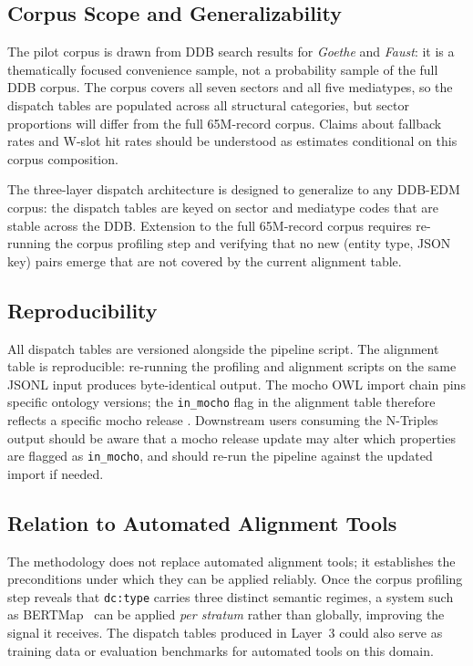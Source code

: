 \subsection{Corpus Scope and Generalizability}

The pilot corpus is drawn from DDB search results for \textit{Goethe} and
\textit{Faust}: it is a thematically focused convenience sample, not a
probability sample of the full DDB corpus.
The corpus covers all seven sectors and all five mediatypes, so the dispatch
tables are populated across all structural categories, but sector proportions
will differ from the full 65M-record corpus.
Claims about fallback rates and W-slot hit rates should be understood as
estimates conditional on this corpus composition.

The three-layer dispatch architecture is designed to generalize to any
DDB-EDM corpus: the dispatch tables are keyed on sector and mediatype codes
that are stable across the DDB.
Extension to the full 65M-record corpus requires re-running the corpus
profiling step and verifying that no new (entity type, JSON key) pairs
emerge that are not covered by the current alignment table.

\subsection{Reproducibility}

All dispatch tables are versioned alongside the pipeline script.
The alignment table is reproducible: re-running the profiling and alignment
scripts on the same JSONL input produces byte-identical output.
The mocho OWL import chain pins specific ontology versions; the
\texttt{in\_mocho} flag in the alignment table therefore reflects a
specific mocho release .
Downstream users consuming the N-Triples output should be aware that a
mocho release update may alter which properties are flagged as \texttt{in\_mocho},
and should re-run the pipeline against the updated import if needed.

\subsection{Relation to Automated Alignment Tools}

The methodology does not replace automated alignment tools; it establishes
the preconditions under which they can be applied reliably.
Once the corpus profiling step reveals that \texttt{dc:type} carries three
distinct semantic regimes, a system such as BERTMap~\cite{he2022bertmap} can
be applied \emph{per stratum} rather than globally, improving the signal it
receives.
The dispatch tables produced in Layer~3 could also serve as training data or
evaluation benchmarks for automated tools on this domain.
